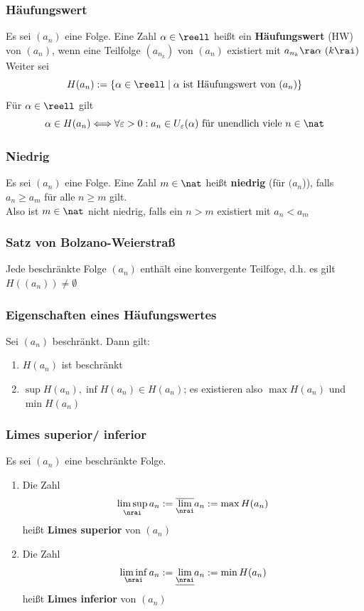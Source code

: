\documentclass{kit}
\newcommand\f{(a_n)}
\begin{document}
    \subsubsection{Häufungswert}
      Es sei $(a_n)$ eine Folge. Eine Zahl $\alpha\in\reell$ heißt ein \textbf{Häufungswert} (HW) von $(a_n)$, wenn eine Teilfolge $(a_{n_k})$ von $(a_n)$ existiert mit $a_{n_k}\ra\alpha\ (k\rai)$\\
      Weiter sei
      $$H(a_n):=\{\alpha\in\reell\mid\alpha\text{ ist Häufungswert von }(a_n)\}$$
      Für $\alpha\in\reell$ gilt
      $$\alpha\in H(a_n)\Longleftrightarrow\forall\varepsilon>0:a_n\in U_\varepsilon(\alpha)\text{ für unendlich viele }n\in\nat$$
    \subsubsection{Niedrig}
      Es sei $(a_n)$ eine Folge. Eine Zahl $m\in\nat$ heißt \textbf{niedrig} (für $(a_n$)), falls $a_n\ge a_m$ für alle $n\ge m$ gilt.\\
      Also ist $m\in\nat$ nicht niedrig, falls ein $n>m$ existiert mit $a_n<a_m$
    \subsubsection{Satz von Bolzano-Weierstraß}
      Jede beschränkte Folge $\f$ enthält eine konvergente Teilfoge, d.h. es gilt $H(\f)\neq\emptyset$
    \subsubsection{Eigenschaften eines Häufungswertes}
      Sei $\f$ beschränkt. Dann gilt:
      \begin{enumerate}
        \item $H\f$ ist beschränkt
        \item $\sup H\f,\inf H\f\in H\f$; es existieren also $\max H\f$ und $\min H\f$
      \end{enumerate}
    \subsubsection{Limes superior/ inferior}
      Es sei $\f$ eine beschränkte Folge.
      \begin{enumerate}
        \item Die Zahl
          $$\limsup_\nrai a_n:=\overline{\lim_\nrai}a_n:=\max H\f$$
          heißt \textbf{Limes superior} von $\f$
        \item Die Zahl
          $$\liminf_\nrai a_n:=\underline{\lim_\nrai}a_n:=\min H\f$$
          heißt \textbf{Limes inferior} von $\f$
      \end{enumerate}
\end{document}

